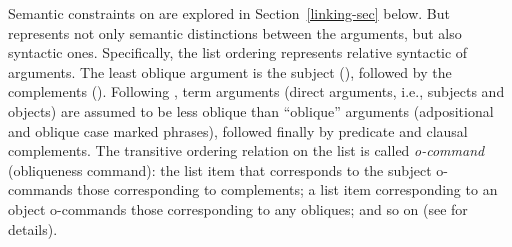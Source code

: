 \documentclass[output=paper
 	        ,biblatex
                ,babelshorthands
                ,newtxmath
                ,draftmode
                ,colorlinks, citecolor=brown
]{langscibook}
\begin{document}
Semantic constraints on \argst are explored in Section~\ref{linking-sec} below.  But \argst represents not only
semantic distinctions between the arguments, but also  %
syntactic  ones.  Specifically, the list ordering represents relative syntactic 
of arguments.   The least oblique argument is the subject (\subj), followed by the complements
(\comps).  Following \citet{Manning1996}, term arguments (direct arguments, i.e., subjects and
objects) are  assumed to be less oblique than ``oblique'' arguments (adpositional and oblique case
marked phrases), followed finally by predicate and clausal complements.  The transitive ordering
relation on the \argst list is called \textit{o-command} (obliqueness
command): the list item that corresponds to the
subject o-commands those corresponding to complements; a list item corresponding to an object
o-commands  those corresponding to any obliques; and so on (see
 for details). 
 


\end{document}
